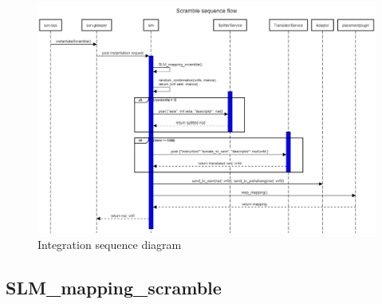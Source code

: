 \begin{figure}[H]
	\centering
	\includegraphics[width=1\linewidth]{"figures/scramble_seq_diag"}
	\caption{Integration sequence diagram}
	\label{fig:sequence-diagram-scramble}
\end{figure}

\subsection{\textbf{SLM\_mapping\_scramble}}

